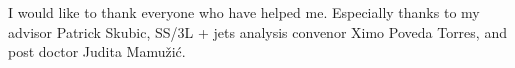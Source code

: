 I would like to thank everyone who have helped me.
Especially thanks to my advisor Patrick Skubic, SS/3L + jets analysis convenor Ximo Poveda Torres, and post doctor Judita Mamu\v{z}i\'{c}.



